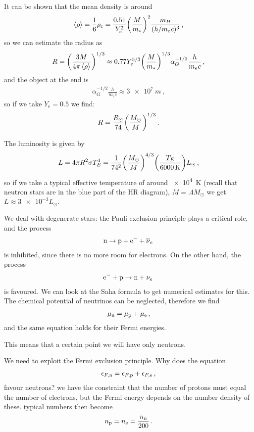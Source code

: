 \documentclass[main.tex]{subfiles}
\begin{document}
It can be shown that the mean density is around 
%
\begin{align}
\expval{\rho } = \frac{1}{6} \rho_{c}
= \frac{\num{.51}}{Y_e^2} \qty(\frac{M}{m_{*}})^2
\frac{m_H}{( h / m_e c)^3}
\,,
\end{align}
%
so we can estimate the radius as 
%
\begin{align}
R = \qty(\frac{3 M }{4 \pi \expval{\rho }})^{1/3} 
\approx \num{.77} Y_e^{5/3} \qty(\frac{M}{m_{*}})^{1/3} \alpha_{G}^{-1/2} \frac{h}{m_e c} 
\,,
\end{align}
%
and the object at the end is 
%
\begin{align}
    \alpha_{G}^{-1/2} \frac{h}{m_e c} \approx \SI{3e7}{m}
\,,
\end{align}
%
so if we take \(Y_e = 0.5\) we find:
%
\begin{align}
R = \frac{R_{\odot}}{74} \qty(\frac{M_{\odot}}{M})^{1/3}
\,.
\end{align}

The luminosity is given by 
%
\begin{align}
L = 4 \pi R^2 \sigma T_E^{4}
= \frac{1}{74^2} \qty(\frac{M_{\odot}}{M})^{4/3}
\qty(\frac{T_E }{\SI{6000}{K}}) L_{\odot}
\,,
\end{align}
%
so if we take a typical effective temperature of around \SI{e4}{K} (recall that neutron stars are in the blue part of the HR diagram), \(M = \num{.4} M_{\odot}\) we get \(L \approx \num{3e-3} L_{\odot}\). 

We deal with degenerate stars: the Pauli exclusion principle plays a critical role, and the process 
%
\begin{align}
\ce{n} \rightarrow \ce{p} + \ce{e-} + \overline{\nu}_{e}
\,
\end{align}
%
is inhibited, since there is no more room for electrons. On the other hand, the process 
%
\begin{align}
\ce{e-} + \ce{p} \rightarrow \ce{n} + \nu_{e}
\,
\end{align}
%
is favoured. We can look at the Saha formula to get numerical estimates for this. The chemical potential of neutrinos can be neglected, therefore we find 
%
\begin{align}
\mu_{\ce{n}} = \mu_{\ce{p}} + \mu_{\ce{e}} 
\,,
\end{align}
%
and the same equation holds for their Fermi energies. 

This means that a certain point we will have only neutrons. 

We need to exploit the Fermi exclusion principle. Why does the equation 
%
\begin{align}
\epsilon_{F, \ce{n}} = \epsilon_{F, \ce{p}} + \epsilon_{F, \ce{e}}
\,,
\end{align}
%
favour neutrons? we have the constraint that the number of protons must equal the number of electrons, but the Fermi energy depends on the number density of these. typical numbers then become 
%
\begin{align}
n_{\ce{p}} = n_{\ce{e}} = \frac{n_{\ce{n}}}{200}
\,.
\end{align}
\end{document}
